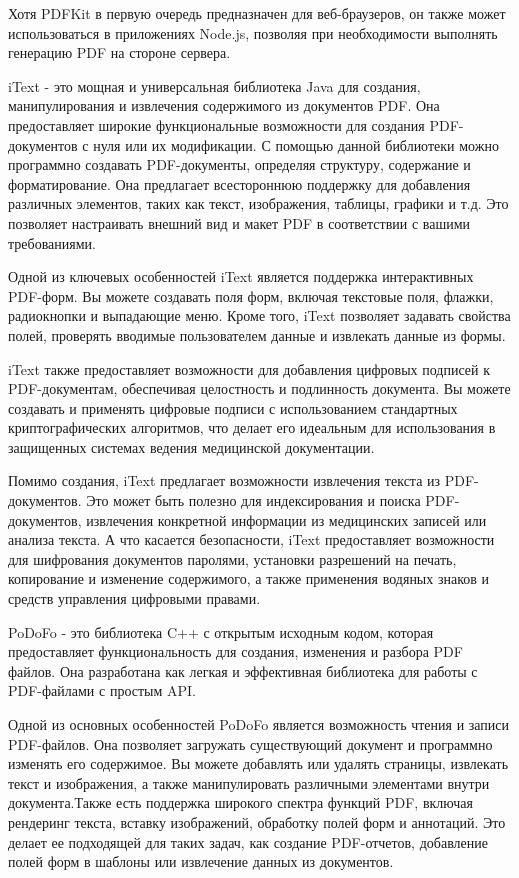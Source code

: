 Хотя PDFKit в первую очередь предназначен для веб-браузеров, он также может использоваться в приложениях Node.js, позволяя при необходимости выполнять генерацию PDF на стороне сервера.

iText - это мощная и универсальная библиотека Java для создания, манипулирования и извлечения содержимого из документов PDF. Она предоставляет широкие функциональные возможности для создания PDF-документов с нуля или их модификации. С помощью данной библиотеки можно программно создавать PDF-документы, определяя структуру, содержание и форматирование. Она предлагает всестороннюю поддержку для добавления различных элементов, таких как текст, изображения, таблицы, графики и т.д. Это позволяет настраивать внешний вид и макет PDF в соответствии с вашими требованиями.

Одной из ключевых особенностей iText является поддержка интерактивных PDF-форм. Вы можете создавать поля форм, включая текстовые поля, флажки, радиокнопки и выпадающие меню. Кроме того, iText позволяет задавать свойства полей, проверять вводимые пользователем данные и извлекать данные из формы.

iText также предоставляет возможности для добавления цифровых подписей к PDF-документам, обеспечивая целостность и подлинность документа. Вы можете создавать и применять цифровые подписи с использованием стандартных криптографических алгоритмов, что делает его идеальным для использования в защищенных системах ведения медицинской документации.

Помимо создания, iText предлагает возможности извлечения текста из PDF-документов. Это может быть полезно для индексирования и поиска PDF-документов, извлечения конкретной информации из медицинских записей или анализа текста. А что касается безопасности, iText предоставляет возможности для шифрования документов паролями, установки разрешений на печать, копирование и изменение содержимого, а также применения водяных знаков и средств управления цифровыми правами.

PoDoFo - это библиотека C++ с открытым исходным кодом, которая предоставляет функциональность для создания, изменения и разбора PDF файлов. Она разработана как легкая и эффективная библиотека для работы с PDF-файлами с простым API.

Одной из основных особенностей PoDoFo является возможность чтения и записи PDF-файлов. Она позволяет загружать существующий документ и программно изменять его содержимое. Вы можете добавлять или удалять страницы, извлекать текст и изображения, а также манипулировать различными элементами внутри документа.Также есть поддержка широкого спектра функций PDF, включая рендеринг текста, вставку изображений, обработку полей форм и аннотаций. Это делает ее подходящей для таких задач, как создание PDF-отчетов, добавление полей форм в шаблоны или извлечение данных из документов.

